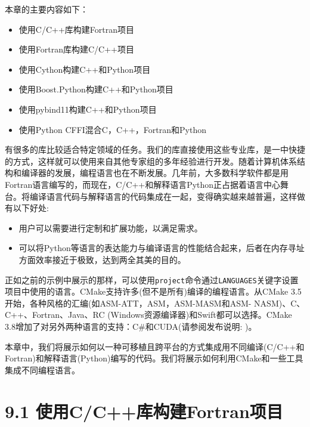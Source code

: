 本章的主要内容如下：

\begin{itemize}
\item 使用C/C++库构建Fortran项目

\item 使用Fortran库构建C/C++项目

\item 使用Cython构建C++和Python项目

\item 使用Boost.Python构建C++和Python项目

\item 使用pybind11构建C++和Python项目

\item 使用Python CFFI混合C，C++，Fortran和Python

\end{itemize}

有很多的库比较适合特定领域的任务。我们的库直接使用这些专业库，是一中快捷的方式，这样就可以使用来自其他专家组的多年经验进行开发。随着计算机体系结构和编译器的发展，编程语言也在不断发展。几年前，大多数科学软件都是用Fortran语言编写的，而现在，C/C++和解释语言Python正占据着语言中心舞台。将编译语言代码与解释语言的代码集成在一起，变得确实越来越普遍，这样做有以下好处:

\begin{itemize}
\item 用户可以需要进行定制和扩展功能，以满足需求。

\item 可以将Python等语言的表达能力与编译语言的性能结合起来，后者在内存寻址方面效率接近于极致，达到两全其美的目的。

\end{itemize}

正如之前的示例中展示的那样，可以使用\texttt{project}命令通过\texttt{LANGUAGES}关键字设置项目中使用的语言。CMake支持许多(但不是所有)编译的编程语言。从CMake 3.5开始，各种风格的汇编(如ASM-ATT，ASM，ASM-MASM和ASM- NASM)、C、C++、Fortran、Java、RC (Windows资源编译器)和Swift都可以选择。CMake 3.8增加了对另外两种语言的支持：C\#和CUDA(请参阅发布说明: )。

本章中，我们将展示如何以一种可移植且跨平台的方式集成用不同编译(C/C++和Fortran)和解释语言(Python)编写的代码。我们将展示如何利用CMake和一些工具集成不同编程语言。


\section{9.1 使用C/C++库构建Fortran项目}

